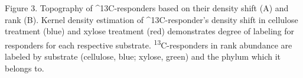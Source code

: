 Figure 3.  Topography of ^{13}C-responders based on their density shift (A) and rank (B). Kernel density estimation of ^{13}C-responder's density shift in cellulose treatment (blue) and xylose treatment (red) demonstrates degree of labeling for responders for each respective substrate. \textsuperscript{13}C-responders in rank abundance are labeled by substrate (cellulose, blue; xylose, green) and the phylum which it belongs to.  